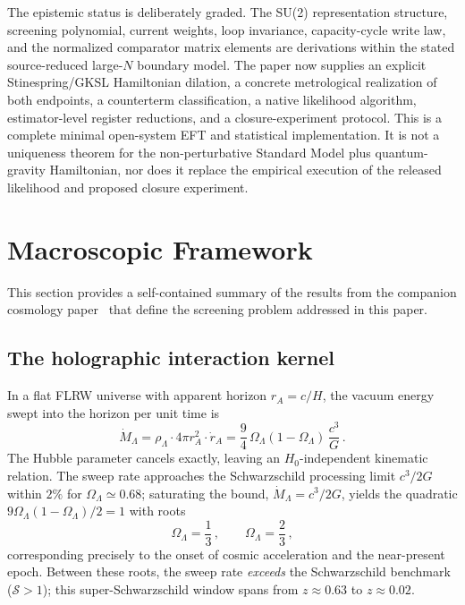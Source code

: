 \documentclass[aps,prd,twocolumn,10pt,superscriptaddress,nofootinbib]{revtex4-2}
\begin{document}
The epistemic status is deliberately graded.  The SU(2) representation
structure, screening polynomial, current weights, loop invariance,
capacity-cycle write law, and the normalized comparator matrix elements are
derivations within the stated source-reduced large-$N$ boundary model.  The
paper now supplies an explicit Stinespring/GKSL Hamiltonian dilation, a
concrete metrological realization of both endpoints, a counterterm
classification, a native likelihood algorithm, estimator-level register
reductions, and a closure-experiment protocol.  This is a complete minimal
open-system EFT and statistical implementation.  It is not a uniqueness
theorem for the non-perturbative Standard Model plus quantum-gravity
Hamiltonian, nor does it replace the empirical execution of the released
likelihood and proposed closure experiment.


\section{Macroscopic Framework}
\label{sec:macro}

This section provides a self-contained summary of the results from
the companion cosmology paper~\cite{Sayegh2026} that define the screening problem addressed
in this paper.

\subsection{The holographic interaction kernel}
\label{sec:kernel_recap}

In a flat FLRW universe with apparent horizon $r_A = c/H$, the
vacuum energy swept into the horizon per unit time is
\begin{equation}
\dot{M}_\Lambda
  = \rho_\Lambda \cdot 4\pi r_A^2 \cdot \dot{r}_A
  = \frac{9}{4}\,\Omega_\Lambda(1-\Omega_\Lambda)\,\frac{c^3}{G}\,.
\label{eq:sweep}
\end{equation}
The Hubble parameter cancels exactly, leaving an
$H_0$-independent kinematic relation.  The sweep rate approaches
the Schwarzschild processing limit $c^3/2G$ within $2\%$ for
$\Omega_\Lambda \simeq 0.68$; saturating the bound,
$\dot{M}_\Lambda = c^3/2G$, yields the quadratic
$9\Omega_\Lambda(1-\Omega_\Lambda)/2 = 1$ with roots
\begin{equation}
\Omega_\Lambda = \frac{1}{3}\,,\qquad \Omega_\Lambda = \frac{2}{3}\,,
\label{eq:roots}
\end{equation}
corresponding precisely to the onset of cosmic acceleration and
the near-present epoch.  Between these roots, the sweep rate
\emph{exceeds} the Schwarzschild benchmark ($\mathcal{S} > 1$);
this super-Schwarzschild window spans from $z \approx 0.63$
to $z \approx 0.02$.
\end{document}
